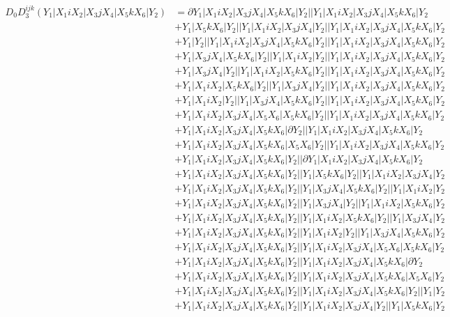 \documentclass{article}[12pt]
\begin{document}
\begin{align*}
D_0 D_3^{ijk}(Y_1|X_1iX_2|X_3jX_4|X_5kX_6|Y_2)& =\partial Y_1|X_1iX_2|X_3jX_4|X_5kX_6|Y_2||Y_1|X_1iX_2|X_3jX_4|X_5kX_6|Y_2\\ 
 & +Y_1|X_5kX_6|Y_2||Y_1|X_1iX_2|X_3jX_4|Y_2||Y_1|X_1iX_2|X_3jX_4|X_5kX_6|Y_2\\ 
 & +Y_1|Y_2||Y_1|X_1iX_2|X_3jX_4|X_5kX_6|Y_2||Y_1|X_1iX_2|X_3jX_4|X_5kX_6|Y_2\\ 
 & +Y_1|X_3jX_4|X_5kX_6|Y_2||Y_1|X_1iX_2|Y_2||Y_1|X_1iX_2|X_3jX_4|X_5kX_6|Y_2\\ 
 & +Y_1|X_3jX_4|Y_2||Y_1|X_1iX_2|X_5kX_6|Y_2||Y_1|X_1iX_2|X_3jX_4|X_5kX_6|Y_2\\ 
 & +Y_1|X_1iX_2|X_5kX_6|Y_2||Y_1|X_3jX_4|Y_2||Y_1|X_1iX_2|X_3jX_4|X_5kX_6|Y_2\\ 
 & +Y_1|X_1iX_2|Y_2||Y_1|X_3jX_4|X_5kX_6|Y_2||Y_1|X_1iX_2|X_3jX_4|X_5kX_6|Y_2\\ 
 & +Y_1|X_1iX_2|X_3jX_4|X_5X_6|X_5kX_6|Y_2||Y_1|X_1iX_2|X_3jX_4|X_5kX_6|Y_2\\ 
 & +Y_1|X_1iX_2|X_3jX_4|X_5kX_6|\partial Y_2||Y_1|X_1iX_2|X_3jX_4|X_5kX_6|Y_2\\ 
 & +Y_1|X_1iX_2|X_3jX_4|X_5kX_6|X_5X_6|Y_2||Y_1|X_1iX_2|X_3jX_4|X_5kX_6|Y_2\\ 
 & +Y_1|X_1iX_2|X_3jX_4|X_5kX_6|Y_2||\partial Y_1|X_1iX_2|X_3jX_4|X_5kX_6|Y_2\\ 
 & +Y_1|X_1iX_2|X_3jX_4|X_5kX_6|Y_2||Y_1|X_5kX_6|Y_2||Y_1|X_1iX_2|X_3jX_4|Y_2\\ 
 & +Y_1|X_1iX_2|X_3jX_4|X_5kX_6|Y_2||Y_1|X_3jX_4|X_5kX_6|Y_2||Y_1|X_1iX_2|Y_2\\ 
 & +Y_1|X_1iX_2|X_3jX_4|X_5kX_6|Y_2||Y_1|X_3jX_4|Y_2||Y_1|X_1iX_2|X_5kX_6|Y_2\\ 
 & +Y_1|X_1iX_2|X_3jX_4|X_5kX_6|Y_2||Y_1|X_1iX_2|X_5kX_6|Y_2||Y_1|X_3jX_4|Y_2\\ 
 & +Y_1|X_1iX_2|X_3jX_4|X_5kX_6|Y_2||Y_1|X_1iX_2|Y_2||Y_1|X_3jX_4|X_5kX_6|Y_2\\ 
 & +Y_1|X_1iX_2|X_3jX_4|X_5kX_6|Y_2||Y_1|X_1iX_2|X_3jX_4|X_5X_6|X_5kX_6|Y_2\\ 
 & +Y_1|X_1iX_2|X_3jX_4|X_5kX_6|Y_2||Y_1|X_1iX_2|X_3jX_4|X_5kX_6|\partial Y_2\\ 
 & +Y_1|X_1iX_2|X_3jX_4|X_5kX_6|Y_2||Y_1|X_1iX_2|X_3jX_4|X_5kX_6|X_5X_6|Y_2\\ 
 & +Y_1|X_1iX_2|X_3jX_4|X_5kX_6|Y_2||Y_1|X_1iX_2|X_3jX_4|X_5kX_6|Y_2||Y_1|Y_2\\ 
 & +Y_1|X_1iX_2|X_3jX_4|X_5kX_6|Y_2||Y_1|X_1iX_2|X_3jX_4|Y_2||Y_1|X_5kX_6|Y_2\\ 

\end{align*}
\end{document}
